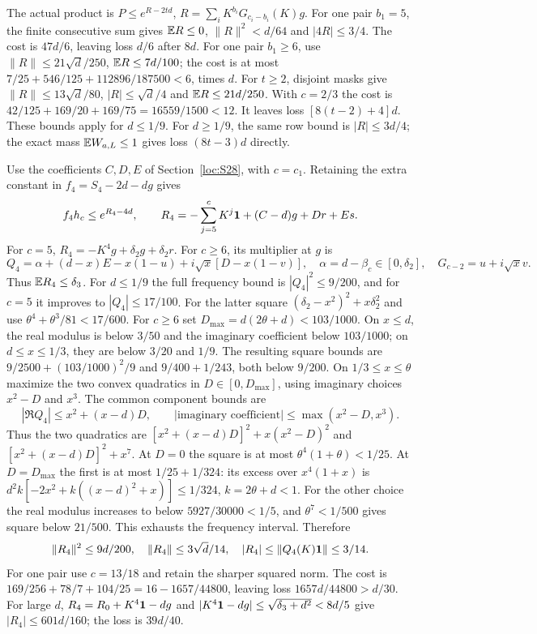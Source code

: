 The actual product is $P\le e^{R-2td}$,
$R=\sum_iK^{b_i}G_{c_i-b_i}(K)g$.
For one pair $b_1=5$, the finite consecutive sum gives
$\mathbb E R\le0$, $\|R\|^2<d/64$ and $|4R|\le3/4$.
The cost is $47d/6$, leaving loss $d/6$ after $8d$.
For one pair $b_1\ge6$, use
$\|R\|\le21\sqrt d/250$, $\mathbb E R\le7d/100$;
the cost is at most $7/25+546/125+112896/187500<6$, times $d$.
For $t\ge2$, disjoint masks give
$\|R\|\le13\sqrt d/80$, $|R|\le\sqrt d/4$ and
$\mathbb E R\le21d/250$. With $c=2/3$ the cost is
$42/125+169/20+169/75=16559/1500<12$.
It leaves loss $[8(t-2)+4]d$.
These bounds apply for $d\le1/9$.
For $d\ge1/9$, the same row bound is $|R|\le3d/4$;
the exact mass $\mathbb E W_{a,L}\le1$ gives loss $(8t-3)d$ directly.

Use the coefficients $C,D,E$ of Section~\ref{loc:S28}, with $c=c_1$.
Retaining the extra constant in $f_4=S_4-2d-dg$ gives
\[
 f_4h_c\le e^{R_4-4d},\qquad
 R_4=-\sum_{j=5}^cK^j\mathbf1+(C-d)g+Dr+Es.
\]
For $c=5$, $R_4=-K^4g+\delta_{2}g+\delta_{2}r$.
For $c\ge6$, its multiplier at $g$ is
\[
 Q_4=\alpha+(d-x)E-x(1-u)
                  +i\sqrt x[D-x(1-v)],\quad
 \alpha=d-\beta_c\in[0,\delta_{2}],\quad G_{c-2}=u+i\sqrt xv.
\]
Thus $\mathbb E R_4\le \delta_{3}$.
For $d\le1/9$ the full frequency bound is $|Q_4|^2\le9/200$,
and for $c=5$ it improves to $|Q_4|\le17/100$.
For the latter square $(\delta_{2}-x^2)^2+x\delta_{2}^2$ and use
$\theta^4+\theta^3/81<17/600$.
For $c\ge6$ set $D_{\max}=d(2\theta+d)<103/1000$.
On $x\le d$, the real modulus is below $3/50$ and the imaginary
coefficient below $103/1000$; on $d\le x\le1/3$, they are below
$3/20$ and $1/9$. The resulting square bounds are
$9/2500+(103/1000)^2/9$ and $9/400+1/243$, both below $9/200$.
On $1/3\le x\le\theta$ maximize the two convex quadratics in
$D\in[0,D_{\max}]$, using imaginary choices $x^2-D$ and $x^3$.
The common component bounds are
\[
 |\Re Q_4|\le x^2+(x-d)D,\qquad
 |\text{imaginary coefficient}|\le\max(x^2-D,x^3).
\]
Thus the two quadratics are $[x^2+(x-d)D]^2+x(x^2-D)^2$
and $[x^2+(x-d)D]^2+x^7$.
At $D=0$ the square is at most $\theta^4(1+\theta)<1/25$.
At $D=D_{\max}$ the first is at most $1/25+1/324$:
its excess over $x^4(1+x)$ is
$d^2k[-2x^2+k((x-d)^2+x)]\le1/324$, $k=2\theta+d<1$.
For the other choice the real modulus increases to below
$5927/30000<1/5$, and $\theta^7<1/500$ gives square below $21/500$.
This exhausts the frequency interval. Therefore
\[
 \|R_4\|^2\le9d/200,\quad\|R_4\|\le3\sqrt d/14,
 \quad |R_4|\le\|Q_4(K)\mathbf1\|\le3/14.
\]
For one pair use $c=13/18$ and retain the sharper squared norm.
The cost is $169/256+78/7+104/25=16-1657/44800$,
leaving loss $1657d/44800>d/30$.
For large $d$, $R_4=R_0+K^4\mathbf1-dg$ and
$|K^4\mathbf1-dg|\le\sqrt{\delta_{3}+d^2}<8d/5$ give
$|R_4|\le601d/160$; the loss is $39d/40$.

